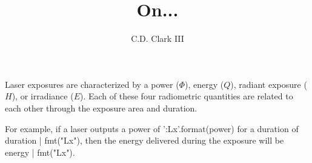 \documentclass[]{article}
\author{C.D. Clark III}
\title{On...}
\begin{document}
\maketitle


Laser exposures are characterized by a power ($\Phi$), energy ($Q$), radiant exposure ($H$),
or irradiance ($E$). Each of these four radiometric quantities are related to each other
through the exposure area and duration.


For example, if a laser outputs a power of {{'{:Lx}'.format(power)}} for a
duration of {{duration | fmt("Lx")}}, then the energy delivered during the
exposure will be {{energy | fmt("Lx")}}.
\end{document}
